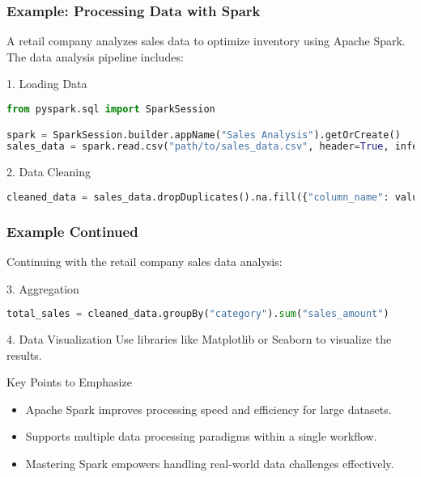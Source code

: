 \documentclass[aspectratio=169]{beamer}
\begin{document}
\begin{frame}[fragile]
    \frametitle{Example: Processing Data with Spark}
    A retail company analyzes sales data to optimize inventory using Apache Spark. The data analysis pipeline includes:

    \begin{block}{1. Loading Data}
      \begin{lstlisting}[language=Python]
from pyspark.sql import SparkSession

spark = SparkSession.builder.appName("Sales Analysis").getOrCreate()
sales_data = spark.read.csv("path/to/sales_data.csv", header=True, inferSchema=True)
      \end{lstlisting}
    \end{block}

    \begin{block}{2. Data Cleaning}
      \begin{lstlisting}[language=Python]
cleaned_data = sales_data.dropDuplicates().na.fill({"column_name": value})
      \end{lstlisting}
    \end{block}
\end{frame}

\begin{frame}[fragile]
    \frametitle{Example Continued}
    Continuing with the retail company sales data analysis:

    \begin{block}{3. Aggregation}
      \begin{lstlisting}[language=Python]
total_sales = cleaned_data.groupBy("category").sum("sales_amount")
      \end{lstlisting}
    \end{block}

    \begin{block}{4. Data Visualization}
    Use libraries like Matplotlib or Seaborn to visualize the results.
    \end{block}

    \begin{block}{Key Points to Emphasize}
        \begin{itemize}
            \item Apache Spark improves processing speed and efficiency for large datasets.
            \item Supports multiple data processing paradigms within a single workflow.
            \item Mastering Spark empowers handling real-world data challenges effectively.
        \end{itemize}
    \end{block}
\end{frame}
\end{document}
